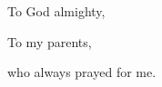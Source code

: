 
\noindent To God almighty,

\vspace{15pt}

\noindent To my parents, 

\hspace{10pt} who always prayed for me.


